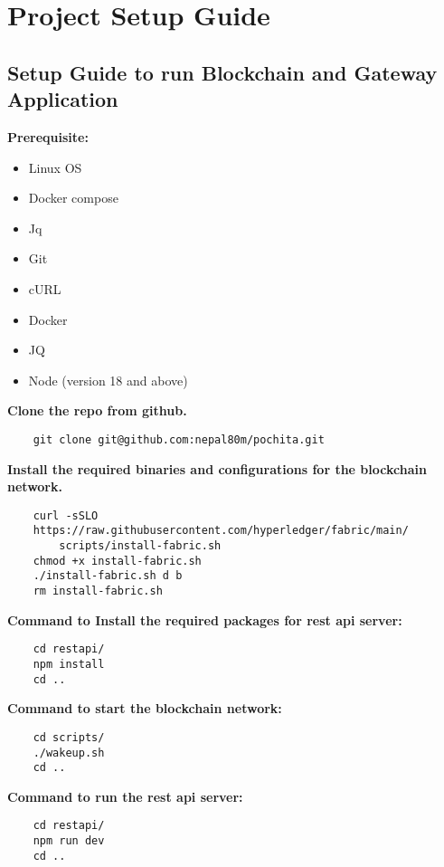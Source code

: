 
\section{Project Setup Guide}
\vspace{15pt}

\tocless\subsection{Setup Guide to run Blockchain and Gateway Application}
\vspace{15pt}
\textbf{Prerequisite:}

\begin{itemize}[noitemsep]
    \item Linux OS
    \item Docker compose
    \item Jq
    \item Git
    \item cURL
    \item Docker
    \item JQ
    \item Node (version 18 and above)
\end{itemize}

\textbf{Clone the repo from github.}
\begin{verbatim}
    git clone git@github.com:nepal80m/pochita.git
\end{verbatim}

\textbf{Install the required binaries and configurations for the blockchain network.}
\begin{verbatim}
    curl -sSLO
    https://raw.githubusercontent.com/hyperledger/fabric/main/
        scripts/install-fabric.sh 
    chmod +x install-fabric.sh 
    ./install-fabric.sh d b
    rm install-fabric.sh
\end{verbatim}
\textbf{Command to Install the required packages for rest api server:}
\begin{verbatim}
    cd restapi/
    npm install
    cd ..
\end{verbatim}

\textbf{Command to start the blockchain network:}
\begin{verbatim}
    cd scripts/
    ./wakeup.sh
    cd ..
\end{verbatim}

\textbf{Command to run the rest api server:}
\begin{verbatim}
    cd restapi/
    npm run dev
    cd .. 
\end{verbatim}



